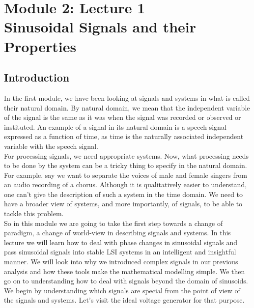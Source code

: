 \section{Module 2: Lecture 1\\Sinusoidal Signals and their Properties}

\subsection*{Introduction}
In the first module, we have been looking at signals and systems in what is
called their natural domain. By natural domain, we mean that the independent
variable of the signal is the same as it was when the signal was
recorded or observed or instituted. An example of a signal in its natural
domain is a speech signal expressed as a function of time, as time is the
naturally associated independent variable with the speech signal. \\
For processing signals, we need appropriate systems. Now, what processing needs to be done by the system can be a tricky thing to specify in the
natural domain. \\
For example, say we want to separate the voices of male and female
singers from an audio recording of a chorus. Although it is qualitatively easier to understand, one can't give the description of such a system in the
time domain. We need to
have a broader view of systems, and more importantly, of signals, to be able
to tackle this problem. \\
So in this module we are going to take the first step towards a change of
paradigm, a change of world-view in describing signals and systems.
In this lecture we will learn how to deal with phase changes in sinusoidal signals and pass sinusoidal signals into stable LSI systems in an intelligent and insightful manner. We will look into why we introduced complex signals in our previous analysis and how these tools make the mathematical modelling simple. We then go on to understanding how to deal with signals beyond the domain of sinusoids.
We begin by understanding which signals are special from the point of view of
the signals and systems. Let's visit the ideal voltage generator for that
purpose.
